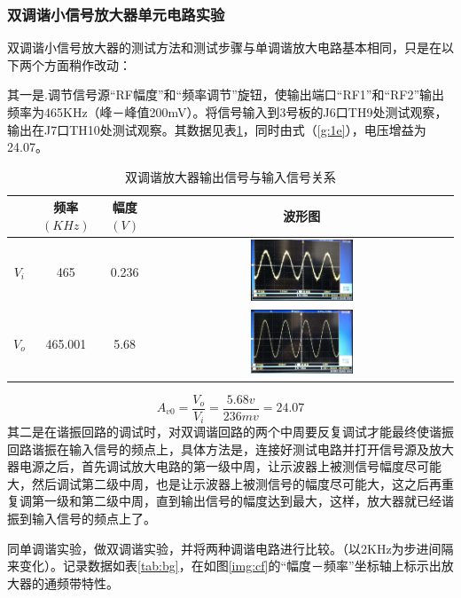\documentclass[12pt]{article}%
\numberwithin{equation}{section}
\begin{document}
\subsubsection{双调谐小信号放大器单元电路实验}
双调谐小信号放大器的测试方法和测试步骤与单调谐放大电路基本相同，只是在以下两个方面稍作改动：\par
其一是.调节信号源“RF幅度”和“频率调节”旋钮，使输出端口“RF1”和“RF2”输出频率为465KHz（峰－峰值200mV）。将信号输入到3号板的J6口TH9处测试观察，输出在J7口TH10处测试观察。其数据见表\ref{my-label1:ad}，同时由式（\ref{g:1e}），电压增益为24.07。\par
\begin{table}[htbp]
\centering
\caption{双调谐放大器输出信号与输入信号关系}
\label{my-label1:ad}
\begin{tabular}{|c|c|c|c|}
\hline
      & 频率$(KHz)$ & 幅度$(V)$ & 波形图 \\ \hline
$V_i$ & 465       & 0.236   &  \includegraphics[width=0.35\textwidth]{gaopin2/gaopin215.jpg}   \\ \hline
$V_o$ & 465.001   & 5.68    & \includegraphics[width=0.35\textwidth]{gaopin2/gaopin216.jpg}      \\ \hline
\end{tabular}
\end{table}
\begin{equation}\label{g:1e}
A_{v0}=\frac{V_{o}}{V_i}=\frac{5.68v}{236mv}=24.07
\end{equation}
其二是在谐振回路的调试时，对双调谐回路的两个中周要反复调试才能最终使谐振回路谐振在输入信号的频点上，具体方法是，连接好测试电路并打开信号源及放大器电源之后，首先调试放大电路的第一级中周，让示波器上被测信号幅度尽可能大，然后调试第二级中周，也是让示波器上被测信号的幅度尽可能大，这之后再重复调第一级和第二级中周，直到输出信号的幅度达到最大，这样，放大器就已经谐振到输入信号的频点上了。\par
同单调谐实验，做双调谐实验，并将两种调谐电路进行比较。（以2KHz为步进间隔来变化）。记录数据如表\ref{tab:bg}，在如图\ref{img:cf}的“幅度－频率”坐标轴上标示出放大器的通频带特性。
\end{document}
